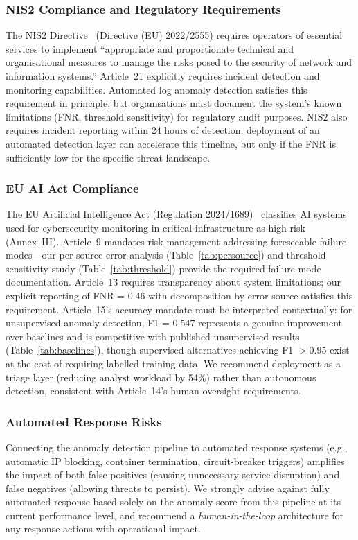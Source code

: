 \documentclass[conference]{IEEEtran}
\begin{document}
\subsubsection{NIS2 Compliance and Regulatory Requirements}
The NIS2 Directive~\cite{nis2directive2022} (Directive (EU) 2022/2555)
requires operators of essential services to implement ``appropriate and
proportionate technical and organisational measures to manage the risks posed
to the security of network and information systems.''  Article~21 explicitly
requires incident detection and monitoring capabilities.  Automated log
anomaly detection satisfies this requirement in principle, but organisations
must document the system's known limitations (FNR, threshold sensitivity)
for regulatory audit purposes.  NIS2 also requires incident reporting within
24 hours of detection; deployment of an automated detection layer can
accelerate this timeline, but only if the FNR is sufficiently low for the
specific threat landscape.

\subsubsection{EU AI Act Compliance}
The EU Artificial Intelligence Act (Regulation 2024/1689)~\cite{euaiact2024}
classifies AI systems used for cybersecurity monitoring in critical
infrastructure as high-risk (Annex~III).  Article~9 mandates risk management
addressing foreseeable failure modes---our per-source error analysis
(Table~\ref{tab:persource}) and threshold sensitivity study
(Table~\ref{tab:threshold}) provide the required failure-mode documentation.
Article~13 requires transparency about system limitations; our explicit
reporting of FNR = 0.46 with decomposition by error source satisfies this
requirement.  Article~15's accuracy mandate must be interpreted contextually:
for unsupervised anomaly detection, F1 = 0.547 represents a genuine
improvement over baselines and is competitive with published unsupervised
results (Table~\ref{tab:baselines}), though supervised alternatives achieving
F1 $> 0.95$ exist at the cost of requiring labelled training data.  We
recommend deployment as a triage layer (reducing analyst workload by 54\%)
rather than autonomous detection, consistent with Article~14's human oversight
requirements.

\subsubsection{Automated Response Risks}
Connecting the anomaly detection pipeline to automated response systems
(e.g., automatic IP blocking, container termination, circuit-breaker
triggers) amplifies the impact of both false positives (causing unnecessary
service disruption) and false negatives (allowing threats to persist).  We
strongly advise against fully automated response based solely on the
anomaly score from this pipeline at its current performance level, and
recommend a \emph{human-in-the-loop} architecture for any response actions
with operational impact.
\end{document}
